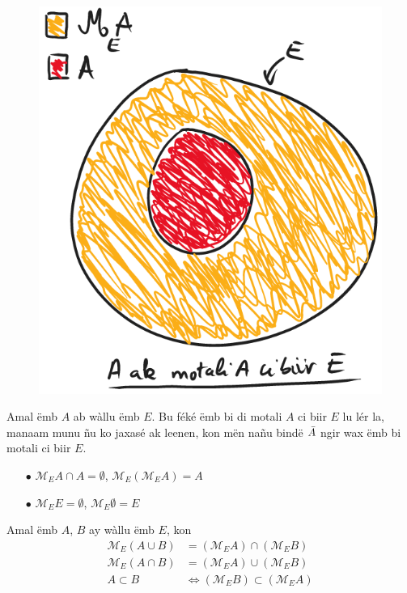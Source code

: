 \documentclass[twoside, a4paper]{article}
\begin{document}
\begin{figure}[ht]
    \centering
    \includegraphics[scale = 0.5]{image/motali_emb.png}
    \label{fig:motali_emb}
\end{figure}
\begin{tcolorbox}[enhanced jigsaw,breakable,pad at break*=1mm, colback=orange!5!white,colframe=white!75!black,title= Seetlu,
  watermark color=white]
Amal ëmb $A$ ab wàllu ëmb $E$. Bu féké ëmb bi di motali $A$ ci biir $E$ lu lér la, manaam munu ñu ko jaxasé ak leenen, kon mën nañu bindë $\Bar{A}$ ngir wax ëmb bi motali ci biir $E$.

\begin{itemize}
    \item[$\bullet$] $\mathcal{M}_{E}A \cap A = \emptyset$, $\mathcal{M}_{E}(\mathcal{M}_{E}A) = A$
    \item[$\bullet$] $\mathcal{M}_{E}E = \emptyset$, $\mathcal{M}_{E}\emptyset = E$
\end{itemize}
\end{tcolorbox}
\begin{tcolorbox}[enhanced jigsaw,breakable,pad at break*=1mm, colback=blue!5!white,colframe=white!75!black,title= Tèg\footnote{Proposition},
  watermark color=white]
Amal ëmb $A$, $B$ ay wàllu ëmb $E$, kon 
\begin{align*}
    \mathcal{M}_{E}(A \cup B) &= (\mathcal{M}_{E}A) \cap (\mathcal{M}_{E}B) \\
    \mathcal{M}_{E}(A \cap B) &= (\mathcal{M}_{E}A) \cup (\mathcal{M}_{E}B) \\
    A \subset B &\iff (\mathcal{M}_{E}B) \subset (\mathcal{M}_{E}A) \\
\end{align*}
\end{tcolorbox}
\end{document}
